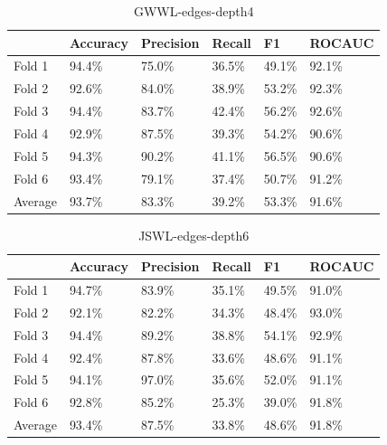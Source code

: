 \documentclass{IEEEtran}
\begin{document}
\begin{table}
    \centering
    \begin{tabular}{l||llll|l}
        \textbf{} & \textbf{Accuracy} & \textbf{Precision} & \textbf{Recall} & \textbf{F1} & \textbf{ROCAUC} \\
        \hline \hline
        Fold 1    & 94.4\%            & 75.0\%             & 36.5\%          & 49.1\%      & 92.1\%          \\
        Fold 2    & 92.6\%            & 84.0\%             & 38.9\%          & 53.2\%      & 92.3\%          \\
        Fold 3    & 94.4\%            & 83.7\%             & 42.4\%          & 56.2\%      & 92.6\%          \\
        Fold 4    & 92.9\%            & 87.5\%             & 39.3\%          & 54.2\%      & 90.6\%          \\
        Fold 5    & 94.3\%            & 90.2\%             & 41.1\%          & 56.5\%      & 90.6\%          \\
        Fold 6    & 93.4\%            & 79.1\%             & 37.4\%          & 50.7\%      & 91.2\%          \\
        \hline
        Average   & 93.7\%            & 83.3\%             & 39.2\%          & 53.3\%      & 91.6\%          \\
    \end{tabular}
    \caption{GWWL-edges-depth4}
\end{table}

\begin{table}
    \centering
    \begin{tabular}{l||llll|l}
        \textbf{} & \textbf{Accuracy} & \textbf{Precision} & \textbf{Recall} & \textbf{F1} & \textbf{ROCAUC} \\
        \hline \hline
        Fold 1    & 94.7\%            & 83.9\%             & 35.1\%          & 49.5\%      & 91.0\%          \\
        Fold 2    & 92.1\%            & 82.2\%             & 34.3\%          & 48.4\%      & 93.0\%          \\
        Fold 3    & 94.4\%            & 89.2\%             & 38.8\%          & 54.1\%      & 92.9\%          \\
        Fold 4    & 92.4\%            & 87.8\%             & 33.6\%          & 48.6\%      & 91.1\%          \\
        Fold 5    & 94.1\%            & 97.0\%             & 35.6\%          & 52.0\%      & 91.1\%          \\
        Fold 6    & 92.8\%            & 85.2\%             & 25.3\%          & 39.0\%      & 91.8\%          \\
        \hline
        Average   & 93.4\%            & 87.5\%             & 33.8\%          & 48.6\%      & 91.8\%          \\
    \end{tabular}
    \caption{JSWL-edges-depth6}
\end{table}
\end{document}
